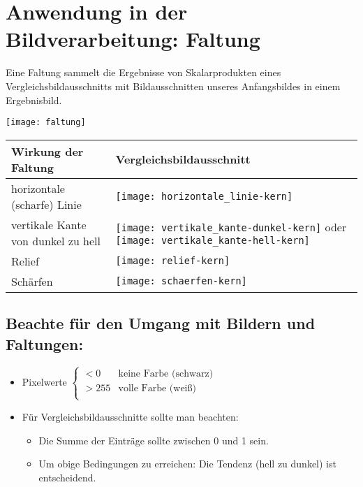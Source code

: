 \bigskip
\bigskip


\section*{Anwendung in der Bildverarbeitung: Faltung}
Eine Faltung sammelt die Ergebnisse von Skalarprodukten eines
Vergleichsbildausschnitts mit Bildausschnitten unseres Anfangsbildes
in einem Ergebnisbild.
\begin{center}
  \texttt{[image: faltung]}
\end{center}

\begin{tabularx}{0.9\linewidth}{@{} X l @{}}
  \textbf{Wirkung der Faltung} & \textbf{Vergleichsbildausschnitt}\\\toprule
  horizontale (scharfe) Linie
  & \parbox[c]{4em}{\texttt{[image: horizontale\_linie-kern]}}
  \\\midrule
  vertikale Kante von dunkel zu hell
  & \parbox[c]{4em}{\texttt{[image: vertikale\_kante-dunkel-kern]}}
    \quad oder \quad
    \parbox[c]{4em}{\texttt{[image: vertikale\_kante-hell-kern]}}
    \\\midrule
  Relief
  & \parbox[c]{4em}{\texttt{[image: relief-kern]}}
  \\\midrule
  Schärfen
  & \parbox[c]{4em}{\texttt{[image: schaerfen-kern]}}
  \\\bottomrule
\end{tabularx}

\subsection*{Beachte für den Umgang mit Bildern und Faltungen:}
\begin{itemize}
\item Pixelwerte
  $\begin{cases}
    <0 & \text{keine Farbe (schwarz)} \\
    >255 & \text{volle Farbe (weiß)} \\
  \end{cases}$
\item Für Vergleichsbildausschnitte sollte man beachten:
  \begin{itemize}
  \item Die Summe der Einträge sollte zwischen 0 und 1 sein.
  \item Um obige Bedingungen zu erreichen:
    Die Tendenz (hell zu dunkel) ist entscheidend.
  \end{itemize}
\end{itemize}

